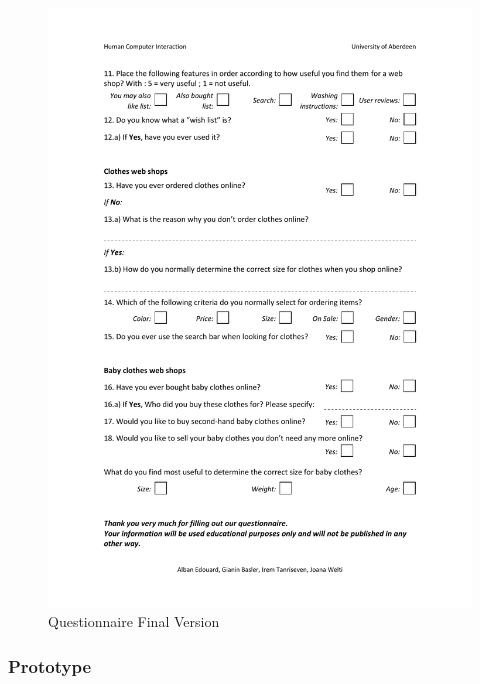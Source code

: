 \begin{figure}[h!]
\centering
\includegraphics[width=1.0\textwidth]{User_Involvement_Methods/Questionnaires/Questionnaire_Web_Shops_v3_2.pdf}
\caption{Questionnaire Final Version}
\label{fig:final}
\end{figure}

\subsubsection{Prototype}

